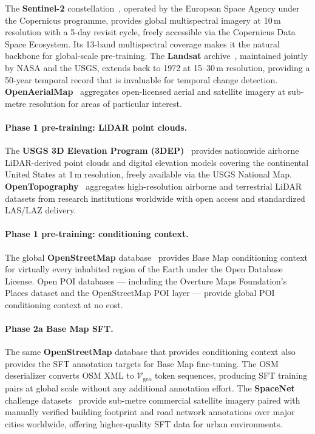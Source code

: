 \documentclass{book}
\begin{document}
The \textbf{Sentinel-2} constellation~\cite{drusch2012sentinel},
operated by the European Space Agency under the Copernicus
programme, provides global multispectral imagery at 10\,m
resolution with a 5-day revisit cycle, freely accessible
via the Copernicus Data Space Ecosystem.  Its 13-band
multispectral coverage makes it the natural backbone for
global-scale pre-training.  The \textbf{Landsat}
archive~\cite{wulder2022landsat}, maintained jointly by
NASA and the USGS, extends back to 1972 at 15--30\,m
resolution, providing a 50-year temporal record that is
invaluable for temporal change detection.
\textbf{OpenAerialMap}~\cite{openaerialmap2015} aggregates
open-licensed aerial and satellite imagery at sub-metre
resolution for areas of particular interest.

\paragraph{Phase 1 pre-training: LiDAR point clouds.}

The \textbf{USGS 3D Elevation Program
(3DEP)}~\cite{usgs3dep} provides nationwide airborne
LiDAR-derived point clouds and digital elevation models
covering the continental United States at 1\,m resolution,
freely available via the USGS National Map.
\textbf{OpenTopography}~\cite{crosby2023opentopo}
aggregates high-resolution airborne and terrestrial LiDAR
datasets from research institutions worldwide with open
access and standardized LAS/LAZ delivery.

\paragraph{Phase 1 pre-training: conditioning context.}

The global \textbf{OpenStreetMap}
database~\cite{haklay2008openstreetmap} provides Base Map
conditioning context for virtually every inhabited region
of the Earth under the Open Database License.  Open POI
databases --- including the Overture Maps Foundation's
Places dataset and the OpenStreetMap POI layer --- provide
global POI conditioning context at no cost.

\paragraph{Phase 2a Base Map SFT.}

The same \textbf{OpenStreetMap} database that provides
conditioning context also provides the SFT annotation
targets for Base Map fine-tuning.  The OSM deserializer
converts OSM XML to $\mathcal{V}_{\text{geo}}$ token
sequences, producing SFT training pairs at global scale
without any additional annotation effort.  The
\textbf{SpaceNet} challenge datasets~\cite{van2018spacenet}
provide sub-metre commercial satellite imagery paired with
manually verified building footprint and road network
annotations over major cities worldwide, offering
higher-quality SFT data for urban environments.
\end{document}
